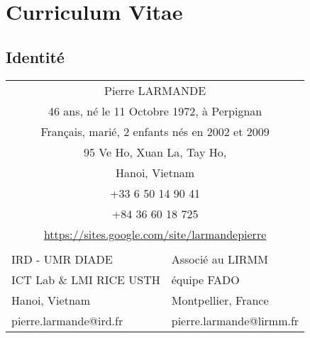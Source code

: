 \chapter{Curriculum Vitae}
\section{Identité}

\begin{center}
\begin{tabular}{cl}
\multicolumn{2}{c}{Pierre LARMANDE} \\
\multicolumn{2}{c}{46 ans, né le 11 Octobre 1972, à Perpignan} \\
\multicolumn{2}{c}{Français, marié, 2 enfants nés en 2002 et 2009} \\
\multicolumn{2}{c}{95 Ve Ho, Xuan La, Tay Ho,} \\
\multicolumn{2}{c}{Hanoi, Vietnam} \\
\multicolumn{2}{c}{+33 6 50 14 90 41} \\
\multicolumn{2}{c}{+84 36 60 18 725} \\
\multicolumn{2}{c}{\url{https://sites.google.com/site/larmandepierre}} \\
\multicolumn{1}{l}{} &  \\
\multicolumn{1}{l}{IRD - UMR DIADE} & Associé au LIRMM \\
\multicolumn{1}{l}{ICT Lab \& LMI RICE USTH} & équipe FADO \\
\multicolumn{1}{l}{Hanoi, Vietnam} & Montpellier, France \\
\multicolumn{1}{l}{pierre.larmande@ird.fr} & pierre.larmande@lirmm.fr
\end{tabular}
\end{center}

